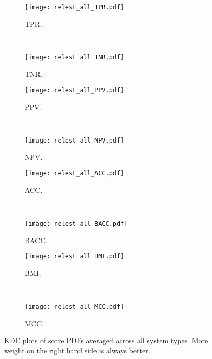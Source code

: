 \documentclass[runningheads]{llncs}
\begin{document}
\begin{figure}[h] %
  \centering
  \begin{subfigure}[t]{0.5\textwidth}
  \texttt{[image: relest\_all\_TPR.pdf]}
  \caption{\acrlong{TPR}.
  \label{fig:relest_all_TPR}}
  \end{subfigure}%
  ~
  \begin{subfigure}[t]{0.5\textwidth}
  \texttt{[image: relest\_all\_TNR.pdf]}
  \caption{\acrlong{TNR}.
  \label{fig:relest_all_TNR}}
  \end{subfigure}%

  \begin{subfigure}[t]{0.5\textwidth}
  \texttt{[image: relest\_all\_PPV.pdf]}
  \caption{\acrlong{PPV}.
  \label{fig:relest_all_PPV}}
  \end{subfigure}%
  ~
  \begin{subfigure}[t]{0.5\textwidth}
  \texttt{[image: relest\_all\_NPV.pdf]}
  \caption{\acrlong{NPV}.
  \label{fig:relest_all_NPV}}
  \end{subfigure}%

  \begin{subfigure}[t]{0.5\textwidth}
  \texttt{[image: relest\_all\_ACC.pdf]}
  \caption{\acrlong{ACC}.
  \label{fig:relest_all_ACC}}
  \end{subfigure}%
  ~
  \begin{subfigure}[t]{0.5\textwidth}
  \texttt{[image: relest\_all\_BACC.pdf]}
  \caption{\acrlong{BACC}.
  \label{fig:relest_all_BACC}}
  \end{subfigure}%

  \begin{subfigure}[t]{0.5\textwidth}
  \texttt{[image: relest\_all\_BMI.pdf]}
  \caption{\acrlong{BMI}.
  \label{fig:relest_all_BMI}}
  \end{subfigure}%
  ~
  \begin{subfigure}[t]{0.5\textwidth}
  \texttt{[image: relest\_all\_MCC.pdf]}
  \caption{\acrlong{MCC}.
  \label{fig:relest_all_MCC}}
  \end{subfigure}%

  \caption{\gls{KDE} plots of score \gls{PDF}s averaged across all system types.
    More weight on the right hand side is always better.
  \label{fig:results1}}
\end{figure} %

\end{document}
